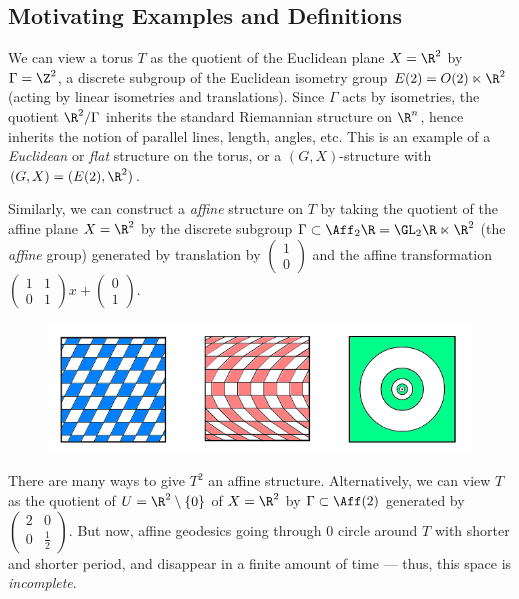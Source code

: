 \documentclass{article}
\begin{document}
\subsection{Motivating Examples and Definitions}
\begin{example}
	We can view a torus $T$ as the quotient of the Euclidean plane $X = \R^2$ by $\Gamma = \Z^2$, a discrete subgroup of the Euclidean isometry group $E(2) = O(2) \ltimes \R^2$ (acting by linear isometries and translations). Since $\Gamma$ acts by isometries, the quotient $\R^2/\Gamma$ inherits the standard Riemannian structure on $\R^n$, hence inherits the notion of parallel lines, length, angles, etc. This is an example of a \textit{Euclidean} or \textit{flat} structure on the torus, or a $(G,X)$-structure with $(G,X) = (E(2), \R^2)$.

	Similarly, we can construct a \textit{affine} structure on $T$ by taking the quotient of the affine plane $X = \R^2$ by the discrete subgroup $\Gamma \subset \Aff_2\R = \GL_2\R \ltimes \R^2$ (the \textit{affine} group) generated by translation by $\begin{pmatrix} 1\\0 \end{pmatrix}$ and the affine transformation $\begin{pmatrix} 1 & 1\\0 & 1 \end{pmatrix}x + \begin{pmatrix} 0\\1 \end{pmatrix}$.
	\begin{figure}[H]
		\centering
		\includegraphics[scale=0.5]{tilings.png}
	\end{figure}

	There are many ways to give $T^2$ an affine structure. Alternatively, we can view $T$ as the quotient of $U = \R^2\setminus\{0\}$ of $X = \R^2$ by $\Gamma \subset \Aff(2)$ generated by $\begin{pmatrix} 2 & 0\\0 & \frac{1}{2} \end{pmatrix}$. But now, affine geodesics going through $0$ circle around $T$ with shorter and shorter period, and disappear in a finite amount of time --- thus, this space is \textit{incomplete}. 


\end{example}
\end{document}
